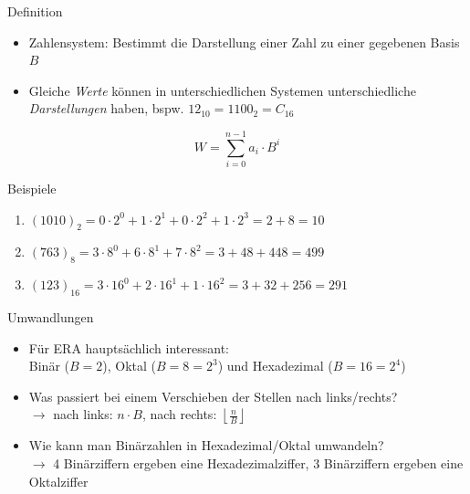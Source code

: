 \begin{frame}[c]{Definition}{}
	\begin{itemize}
		\item Zahlensystem: Bestimmt die Darstellung einer Zahl zu einer gegebenen Basis $B$
		\item Gleiche \emph{Werte} können in unterschiedlichen Systemen unterschiedliche \emph{Darstellungen} haben, bspw. $12_{10}=1100_2=C_{16}$
	\end{itemize}

	\begin{equation}
		W=\sum_{i=0}^{n-1}a_i\cdot B^i
	\end{equation}

	\hspace{1cm}

	\begin{block}{Beispiele}
		\begin{enumerate}
			\item $(1010)_2 = 0\cdot 2^0+1\cdot 2^1+0\cdot 2^2+1\cdot 2^3=2+8=10$
			\item $(763)_8 = 3\cdot 8^0+6\cdot 8^1+7\cdot 8^2=3+48+448=499$
			\item $(123)_{16} = 3\cdot 16^0+2\cdot 16^1+1\cdot 16^2=3+32+256=291$
		\end{enumerate}
	\end{block}
\end{frame}

\begin{frame}[c]{Umwandlungen}{}
	\begin{itemize}
		\item Für ERA hauptsächlich interessant:\\Binär ($B=2$), Oktal ($B=8=2^3$) und Hexadezimal ($B=16=2^4$)
		\item Was passiert bei einem Verschieben der Stellen nach links/rechts?\pause\\
		      $\rightarrow$ nach links: $n\cdot B$, nach rechts: $\left\lfloor{\frac{n}{B}}\right\rfloor$
		\item Wie kann man Binärzahlen in Hexadezimal/Oktal umwandeln?\pause\\
		      $\rightarrow$ 4 Binärziffern ergeben eine Hexadezimalziffer, 3 Binärziffern ergeben eine Oktalziffer
	\end{itemize}
\end{frame}

